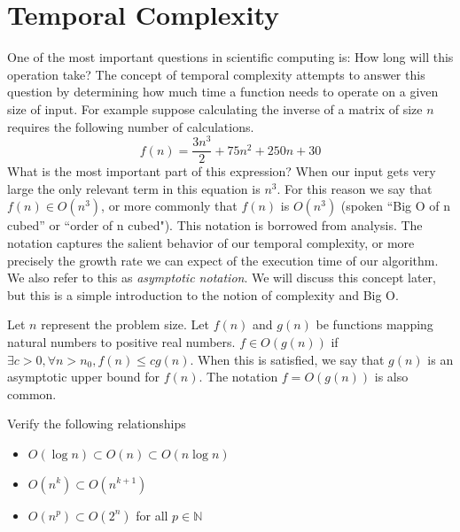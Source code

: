 

\section*{Temporal Complexity}
One of the most important questions in scientific computing is: 
How long will this operation take?  
The concept of temporal complexity attempts to answer this question by determining 
how much time a function needs to operate on a given size of input.  
For example suppose calculating the inverse of a matrix of size $n$ requires the following number of calculations.
\begin{equation*}
f(n) = \frac{3n^3}{2} + 75n^2 + 250n + 30
\end{equation*}
What is the most important part of this expression? 
When our input gets very large the only relevant term in this equation is $n^3$. 
For this reason we say that $f(n) \in O(n^3)$, or more commonly that $f(n)$ is $O(n^3)$ 
(spoken ``Big O of n cubed'' or ``order of n cubed"). 
This notation is borrowed from analysis. The notation captures the salient behavior of our temporal complexity, 
or more precisely the growth rate we can expect of the execution time of our algorithm. 
We also refer to this as \emph{asymptotic notation}. 
We will discuss this concept later, but this is a simple introduction to the notion of complexity and Big O.
\begin{definition}
Let $n$ represent the problem size.  Let $f(n)$ and $g(n)$ be functions mapping natural numbers to positive real numbers. 
$f \in O(g(n))$ if $\exists c > 0, \forall n > n_0, f(n) \leq cg(n)$. 
When this is satisfied, we say that $g(n)$ is an asymptotic upper bound for $f(n)$. 
The notation $f = O(g(n))$ is also common.
\end{definition}

\begin{problem}
Verify the following relationships
\begin{itemize}
\item $O(\log{n}) \subset O(n) \subset O(n\log{n})$
\item $O(n^k) \subset O(n^{k+1})$
\item $O(n^p) \subset O(2^n)$ for all $p \in \mathbb{N}$
\end{itemize}
\end{problem}

